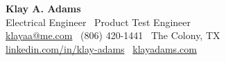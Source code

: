 \begin{center}
    {\Huge \textbf{Klay A. Adams}}\\
    \vspace{4pt}
    \large Electrical Engineer \textbar\ Product Test Engineer \\
    \vspace{4pt}
    \href{mailto:klayaa@me.com}{klayaa@me.com} \textbar\ (806) 420-1441 \textbar\ The Colony, TX \\
    \vspace{4pt}
    \href{https://www.linkedin.com/in/klay-adams/}{linkedin.com/in/klay-adams} \textbar\ \href{https://klayadams.com}{klayadams.com}
\end{center}